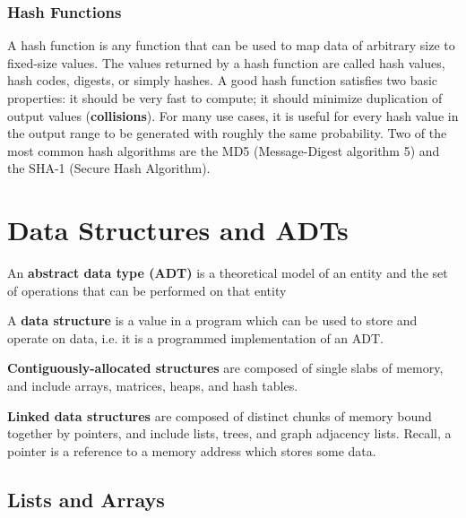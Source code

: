 \documentclass{article}
\begin{document}
    \subsubsection{Hash Functions}
        A hash function is any function that can be used to map data of arbitrary size to fixed-size values. The values returned by a hash function are called hash values, hash codes, digests, or simply hashes. 
        A good hash function satisfies two basic properties: it should be very fast to compute; it should minimize duplication of output values (\textbf{collisions}). For many use cases, it is useful for every hash value in the output range to be generated with roughly the same probability. Two of the most common hash algorithms are the MD5 (Message-Digest algorithm 5) and the SHA-1 (Secure Hash Algorithm).

\section{Data Structures and ADTs}
    An \textbf{abstract data type (ADT)} is a theoretical model of an entity and the set of operations that can be performed on that entity
    
    A \textbf{data structure} is a value in a program which can be used to store and operate on data, i.e. it is a programmed implementation of an ADT.
    
    \textbf{Contiguously-allocated structures} are composed of single slabs of memory, and include arrays, matrices, heaps, and hash tables.
     
    \textbf{Linked data structures} are composed of distinct chunks of memory bound together by pointers, and include lists, trees, and graph adjacency lists. Recall, a pointer is a reference to a memory address which stores some data.

    \subsection{Lists and Arrays}
\end{document}

